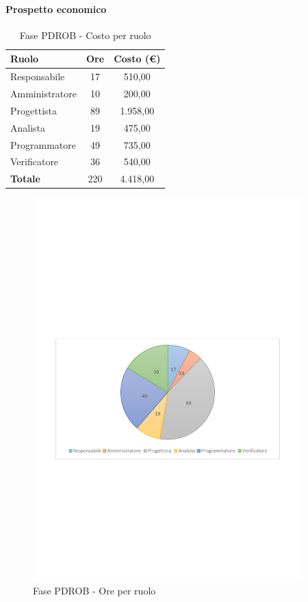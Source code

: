 \documentclass[../PianoProgetto.tex]{subfiles}
\begin{document}
	\paragraph{Prospetto economico}
					
	\begin{table}[h]
		\centering
	
		\begin{tabular}{l * {2}{c}}
			\toprule
			\textbf{Ruolo} & \textbf{Ore} & \textbf{Costo (\euro{})} \\
			\midrule
			Responsabile &	17 & 510,00 \\
			Amministratore & 10 & 200,00 \\
			Progettista & 89 & 1.958,00 \\
			Analista & 19 & 475,00 \\
			Programmatore & 49 & 735,00 \\
			Verificatore & 36 & 540,00 \\
			\midrule		
			\textbf{Totale} & 220 & 4.418,00 \\
			\bottomrule	
		\end{tabular}
		\caption{Fase PDROB - Costo per ruolo}
		\label{tab:fasePDROB_costo}
	\end{table}
\vfill	
\newpage
\vfill
	
	\begin{figure}[!h]
		\centering
		\includegraphics[width=0.93\textwidth , trim=2cm 9.5cm 2cm 11cm]{grafici/PDROB/PDROB-ore-ruolo}
			\caption{Fase PDROB - Ore per ruolo}
		\label{fig:CircleChart-fasePDROB_ore_r}
	\end{figure}
\end{document}
